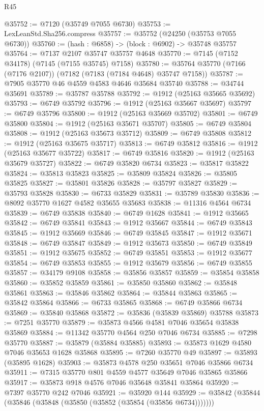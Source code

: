 \begin{lexlean}{R45}
\begin{coremodule}
{@35752 := @7120 (@35749 @7055 @6730)
@35753 := LexLeanStd.Sha256.compress
@35757 := @35752 (@24250 (@35753 @7055 @6730))
@35760 := (hash : @6858) -> (block : @6902) -> @35748 @35757
@35764 := @7137 @2107 @35747 @35757 @4648
@35770 := @7145 (@7152 @34178) (@7145 (@7155 @35745) @7158)
@35780 := @35764 @35770 (@7166 (@7176 @2107)) (@7182 (@7183 (@7184 @4648) @35747 @7158))
@35787 := @7905 @35770 @46 @4559 @4583 @4646 @35684 @35740
@35788 := @34744 @35691
@35789 := @35787 @35788
@35792 := @1912 (@25163 @35665 @35692)
@35793 := @6749 @35792
@35796 := @1912 (@25163 @35667 @35697)
@35797 := @6749 @35796
@35800 := @1912 (@25163 @35669 @35702)
@35801 := @6749 @35800
@35804 := @1912 (@25163 @35671 @35707)
@35805 := @6749 @35804
@35808 := @1912 (@25163 @35673 @35712)
@35809 := @6749 @35808
@35812 := @1912 (@25163 @35675 @35717)
@35813 := @6749 @35812
@35816 := @1912 (@25163 @35677 @35722)
@35817 := @6749 @35816
@35820 := @1912 (@25163 @35679 @35727)
@35822 := @6749 @35820 @6734
@35823 := @35817 @35822
@35824 := @35813 @35823
@35825 := @35809 @35824
@35826 := @35805 @35825
@35827 := @35801 @35826
@35828 := @35797 @35827
@35829 := @35793 @35828
@35830 := @6733 @35829
@35831 := @35789 @35830
@35836 := @8092 @35770 @1627 @4582 @35655 @35683
@35838 := @11316 @4564 @6734
@35839 := @6749 @35838
@35840 := @6749 @1628
@35841 := @1912 @35665
@35842 := @6749 @35841
@35843 := @1912 @35667
@35844 := @6749 @35843
@35845 := @1912 @35669
@35846 := @6749 @35845
@35847 := @1912 @35671
@35848 := @6749 @35847
@35849 := @1912 @35673
@35850 := @6749 @35849
@35851 := @1912 @35675
@35852 := @6749 @35851
@35853 := @1912 @35677
@35854 := @6749 @35853
@35855 := @1912 @35679
@35856 := @6749 @35855
@35857 := @34179 @9108
@35858 := @35856 @35857
@35859 := @35854 @35858
@35860 := @35852 @35859
@35861 := @35850 @35860
@35862 := @35848 @35861
@35863 := @35846 @35862
@35864 := @35844 @35863
@35865 := @35842 @35864
@35866 := @6733 @35865
@35868 := @6749 @35866 @6734
@35869 := @35840 @35868
@35872 := @35836 (@35839 @35869) @35788
@35873 := @7251 @35770
@35879 := @35873 @4566 @4581 @7046 @35654 @35838 @35869
@35884 := @11342 @35770 @4564 @250 @7046 @6734
@35885 := @7298 @35770
@35887 := @35879 (@35884 @35885)
@35893 := @35873 @1629 @4580 @7046 @35653 @1628 @35868
@35895 := @7260 @35770 @49
@35897 := @35893 (@35895 @1628)
@35903 := @35873 @4578 @250 @35651 @7046 @35866 @6734
@35911 := @7315 @35770 @801 @4559 @4577 @35649 @7046 @35865 @35866
@35917 := @35873 @918 @4576 @7046 @35648 @35841 @35864
@35920 := @7397 @35770 @242 @7046
@35921 := @35920 @144
@35929 := @35842 (@35844 (@35846 (@35848 (@35850 (@35852 (@35854 (@35856 @6734)))))))
}
\end{coremodule}
\end{lexlean}
